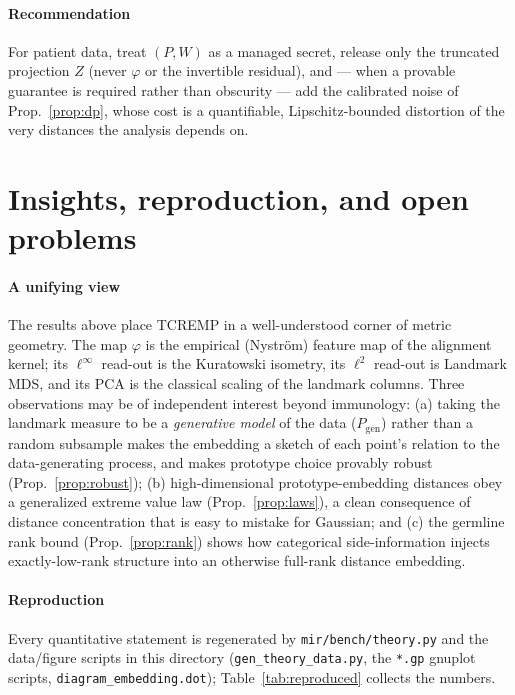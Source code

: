 \documentclass[11pt]{article}
\theoremstyle{oldplain}
\theoremstyle{oldrem}
\newcommand{\Pgen}{P_{\mathrm{gen}}}
\newcommand{\code}[1]{\texttt{#1}}
\begin{document}
\paragraph{Recommendation} For patient data, treat $(P,W)$ as a managed secret, release only the truncated
projection $Z$ (never $\varphi$ or the invertible residual), and --- when a provable guarantee is required
rather than obscurity --- add the calibrated noise of Prop.~\ref{prop:dp}, whose cost is a quantifiable,
Lipschitz-bounded distortion of the very distances the analysis depends on.

\section{Insights, reproduction, and open problems}\label{sec:insights}

\paragraph{A unifying view} The results above place {\scshape TCREMP} in a well-understood corner of
metric geometry. The map $\varphi$ is the empirical (Nystr\"om) feature map of the alignment kernel; its
$\ell^\infty$ read-out is the Kuratowski isometry, its $\ell^2$ read-out is Landmark {\scshape MDS}, and
its {\scshape PCA} is the classical scaling of the landmark columns. Three observations may be of
independent interest beyond immunology: (a) taking the landmark measure to be a \emph{generative model}
of the data ($\Pgen$) rather than a random subsample makes the embedding a sketch of each point's
relation to the data-generating process, and makes prototype choice provably robust
(Prop.~\ref{prop:robust}); (b) high-dimensional prototype-embedding distances obey a generalized
extreme value law (Prop.~\ref{prop:laws}), a clean consequence of distance concentration that is easy to
mistake for Gaussian; and (c) the germline rank bound (Prop.~\ref{prop:rank}) shows how categorical
side-information injects exactly-low-rank structure into an otherwise full-rank distance embedding.

\paragraph{Reproduction} Every quantitative statement is regenerated by \code{mir/bench/theory.py} and
the data/figure scripts in this directory (\code{gen\_theory\_data.py}, the \code{*.gp} gnuplot scripts,
\code{diagram\_embedding.dot}); Table~\ref{tab:reproduced} collects the numbers.
\end{document}

